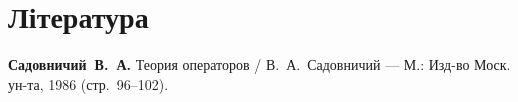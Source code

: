 \section{Література}

\begin{enumerate}[label={[\arabic*]}]
\item \textbf{Садовничий~В.~А.}
Теория операторов /
В.~А.~Садовничий ---
М.: Изд-во Моск. ун-та, 1986 (стр.~96--102).
\end{enumerate}
